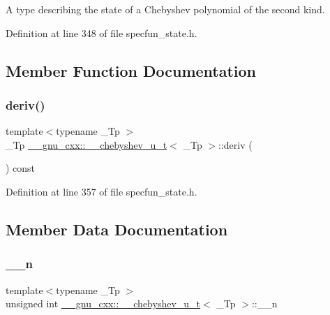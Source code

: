 A type describing the state of a Chebyshev polynomial of the second kind. 

Definition at line 348 of file specfun\+\_\+state.\+h.



\subsection{Member Function Documentation}
\mbox{\label{struct____gnu__cxx_1_1____chebyshev__u__t_ad850788d0ce4eb967c52692f599073cd}} 
\subsubsection{\texorpdfstring{deriv()}{deriv()}}
{\footnotesize\ttfamily template$<$typename \+\_\+\+Tp $>$ \\
\+\_\+\+Tp \hyperlink{struct____gnu__cxx_1_1____chebyshev__u__t}{\+\_\+\+\_\+gnu\+\_\+cxx\+::\+\_\+\+\_\+chebyshev\+\_\+u\+\_\+t}$<$ \+\_\+\+Tp $>$\+::deriv (\begin{DoxyParamCaption}{ }\end{DoxyParamCaption}) const\hspace{0.3cm}{\ttfamily [inline]}}



Definition at line 357 of file specfun\+\_\+state.\+h.



\subsection{Member Data Documentation}
\mbox{\label{struct____gnu__cxx_1_1____chebyshev__u__t_ab003ba7c50085f45f538ab1143ab6fb9}} 
\subsubsection{\texorpdfstring{\+\_\+\+\_\+n}{\_\_n}}
{\footnotesize\ttfamily template$<$typename \+\_\+\+Tp $>$ \\
unsigned int \hyperlink{struct____gnu__cxx_1_1____chebyshev__u__t}{\+\_\+\+\_\+gnu\+\_\+cxx\+::\+\_\+\+\_\+chebyshev\+\_\+u\+\_\+t}$<$ \+\_\+\+Tp $>$\+::\+\_\+\+\_\+n}



